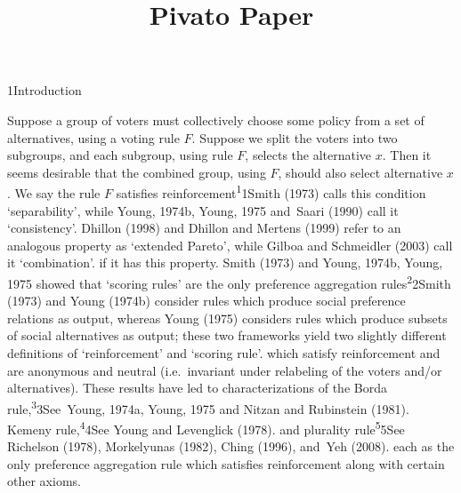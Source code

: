 \documentclass[
]{article}
\title{Pivato Paper}
\author{}
\date{}
\begin{document}
\maketitle

\protect{}\label{s000005}
1Introduction

Suppose a group of voters must collectively choose some policy from a
set of alternatives, using a voting rule \(F\). Suppose we split the
voters into two subgroups, and each subgroup, using rule \(F\), selects
the alternative \(x\). Then it seems desirable that the combined group,
using \(F\), should also select alternative \(x\). We say the rule \(F\)
satisfies reinforcement\textsuperscript{1}1Smith (1973) calls this
condition `separability', while Young, 1974b, Young, 1975 and~Saari
(1990) call it `consistency'. Dhillon (1998) and Dhillon and Mertens
(1999) refer to an analogous property as `extended Pareto', while Gilboa
and Schmeidler (2003) call it `combination'. if it has this property.
Smith (1973) and Young, 1974b, Young, 1975 showed that `scoring rules'
are the only preference aggregation rules\textsuperscript{2}2Smith
(1973) and Young (1974b) consider rules which produce social preference
relations as output, whereas Young (1975) considers rules which produce
subsets of social alternatives as output; these two frameworks yield two
slightly different definitions of `reinforcement' and `scoring rule'.
which satisfy reinforcement and are anonymous and neutral
(i.e.~invariant under relabeling of the voters and/or alternatives).
These results have led to characterizations of the Borda
rule,\textsuperscript{3}3See~Young, 1974a, Young, 1975 and Nitzan and
Rubinstein (1981). Kemeny rule,\textsuperscript{4}4See Young and
Levenglick (1978). and plurality rule\textsuperscript{5}5See Richelson
(1978), Morkelyunas (1982), Ching (1996), and~Yeh (2008). each as the
only preference aggregation rule which satisfies reinforcement along
with certain other axioms.
\end{document}
